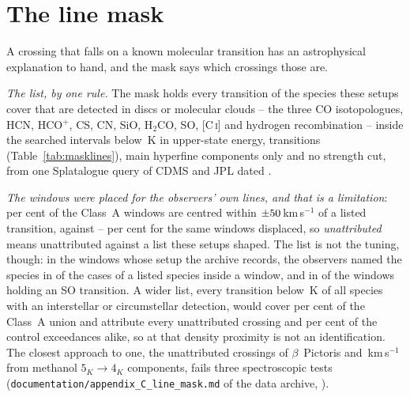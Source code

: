 \section{The line mask}
\label{app:linemask}

A crossing that falls on a known molecular transition has an astrophysical
explanation to hand, and the mask says which crossings those are.

\emph{The list, by one rule.} The mask holds every transition of the
\FrNSpec{} species these setups cover that are detected in discs or molecular
clouds -- the three CO isotopologues, HCN, HCO$^{+}$, CS, CN, SiO, H$_2$CO, SO,
[C\,\textsc{i}] and hydrogen recombination -- inside the \McNIsland{}
searched intervals below \McEuMax\,K in upper-state energy, \FrNTrans{}
transitions (Table~\ref{tab:masklines}), main hyperfine components only and no
strength cut, from one Splatalogue query \citep{Splatalogue2007} of CDMS and
JPL \citep{Pickett1998,CDMS2005} dated \MkListDate.

\emph{The windows were placed for the observers' own lines, and that is a
limitation}: \TnCenPct{} per cent of the \NWinA{} Class~A windows are centred
within $\pm50$\,km\,s$^{-1}$ of a listed transition, against
\TnCtrlCenLo--\TnCtrlCenHi{} per cent for the same windows displaced, so
\emph{unattributed} means unattributed against a list these setups shaped.
The list is not the tuning, though: in the \TuNWinSetup{} windows whose setup
the archive records, the observers named the species in \TuNPairTuned{} of
the \TuNPair{} cases of a listed species inside a window, and in
\TuNSOTuned{} of the \TuNSOWin{} windows holding an SO transition. A wider
list, every transition below \XlEuMax\,K of all \XlNSpecies{} species with an
interstellar or circumstellar detection, would cover \XlBandPct{} per cent of
the Class~A union and attribute every unattributed crossing and
\XlShareWidePct{} per cent of the control exceedances alike, so at that
density proximity is not an identification. The closest approach to one, the
\ZmNCross{} unattributed crossings of $\beta$~Pictoris \ZmDvLo{} and
\ZmDvHi\,km\,s$^{-1}$ from methanol $5_K\to4_K$ components, fails three
spectroscopic tests
(\texttt{documentation/\allowbreak appendix\_C\_line\_mask.md} of the data
archive, \citealt{SIdeposit}).

